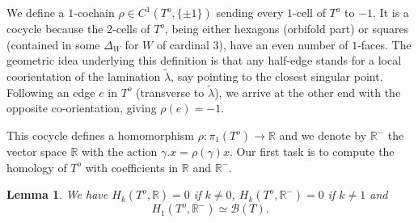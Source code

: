 \documentclass{amsart}
\newtheorem{lemma}{Lemma}
\newcommand{\R}{\mathbb{R}}
\newcommand{\Bb}{\mathcal{B}}
\begin{document}
%
%
We define a $1$-cochain $\rho\in C^1(T^o,\{\pm 1\})$ sending every $1$-cell of $T^o$ to $-1$. It is a cocycle because the $2$-cells of $T^o$, being either hexagons (orbifold part) or squares (contained in some $\Delta_W$ for $W$ of cardinal $3$), have an even number of $1$-faces. %
%
The geometric idea underlying this definition is that any half-edge stands for a local coorientation of the lamination $\tilde{\lambda}$, say pointing to the closest singular point. Following an edge $e$ in $T^o$ (transverse to $\tilde{\lambda}$), we arrive at the other end with the opposite co-orientation, giving $\rho(e)=-1$.

This cocycle defines a homomorphism $\rho:\pi_1(T^o)\to \R$ and we denote by $\R^-$ the vector space $\R$ with the action $\gamma.x=\rho(\gamma)x$. Our first task is to compute the homology of $T^o$ with coefficients in $\R$ and $\R^-$. 

\begin{lemma}\label{homology-arbre}
We have $H_k(T^o,\R)=0$ if $k\ne 0$, $H_k(T^o,\R^-)=0$ if $k\ne 1$ and $$H_1(T^o,\R^-)\simeq \Bb(T).$$ 

\end{lemma}
\end{document}
